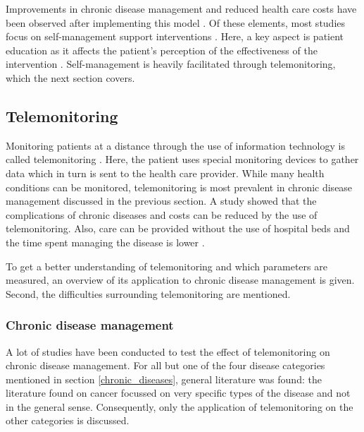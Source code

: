        \noindent Improvements in chronic disease management and reduced health care costs have been observed after implementing this model \cite{bodenheimer2002improving_2}. Of these elements, most studies focus on self-management support interventions \cite{reynolds2018systematic}.  Here, a key aspect is patient education as it affects the patient's perception of the effectiveness of the intervention \cite{wallace2010influence}. Self-management is heavily facilitated through telemonitoring, which the next section covers.

    \subsection{Telemonitoring} \label{2_telemonitoring}
    Monitoring patients at a distance through the use of information technology is called telemonitoring \cite{systematic_review}. Here, the patient uses special monitoring devices to gather data which in turn is sent to the health care provider. While many health conditions can be monitored, telemonitoring is most prevalent in chronic disease management discussed in the previous section. A study showed that the complications of chronic diseases and costs can be reduced by the use of telemonitoring. Also, care can be provided without the use of hospital beds and the time spent managing the disease is lower \cite{telemonitoring_current_state}.

    To get a better understanding of telemonitoring and which parameters are measured, an overview of its application to chronic disease management is given. Second, the difficulties surrounding telemonitoring are mentioned.

        \subsubsection{Chronic disease management} \label{2_telemonitoring_chronic}
        A lot of studies have been conducted to test the effect of telemonitoring on chronic disease management. For all but one of the four disease categories mentioned in section \ref{chronic_diseases}, general literature was found: the literature found on cancer focussed on very specific types of the disease and not in the general sense. Consequently, only the application of telemonitoring on the other categories is discussed.

